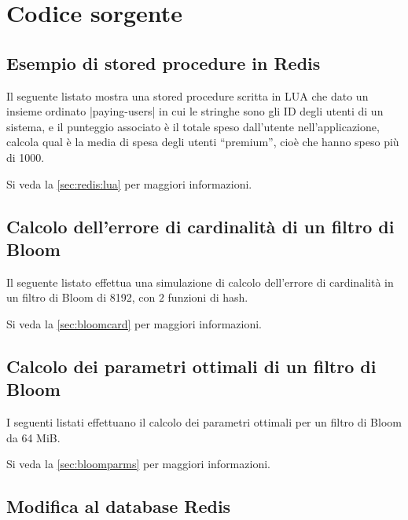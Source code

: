 \chapter{Codice sorgente}

\section{Esempio di stored procedure in Redis}

Il seguente listato mostra una stored procedure scritta in LUA che dato un insieme ordinato
\cverb|paying-users| in cui le stringhe sono gli ID degli utenti di un sistema, e il punteggio
associato è il totale speso dall'utente nell'applicazione, calcola qual è la media di spesa degli
utenti ``premium'', cioè che hanno speso più di \SI{1000}{\EUR}.

Si veda la \autoref{sec:redis:lua} per maggiori informazioni.



\section{Calcolo dell'errore di cardinalità di un filtro di Bloom}

Il seguente listato effettua una simulazione di calcolo dell'errore di cardinalità in un filtro
di Bloom di \SI{8192}{\bit}, con $2$ funzioni di hash.

Si veda la \autoref{sec:bloomcard} per maggiori informazioni.



\section{Calcolo dei parametri ottimali di un filtro di Bloom}

I seguenti listati effettuano il calcolo dei parametri ottimali per un filtro di Bloom da 64 MiB.

Si veda la \autoref{sec:bloomparms} per maggiori informazioni.



\section{Modifica al database Redis}
\label{sec:code:modredis}


